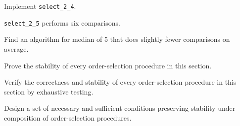 \begin{exercise}
	Implement \verb|select_2_4|.
\end{exercise}

\begin{lemma}
	\verb|select_2_5| performs six comparisons.
\end{lemma}

\begin{exercise}
	Find an algorithm for median of 5 that does slightly fewer comparisons
	on average.
\end{exercise}

\begin{exercise}
	Prove the stability of every order-selection procedure in this
	section.
\end{exercise}

\begin{exercise}
	Verify the correctness and stability of every order-selection
	procedure in this section by exhaustive testing.
\end{exercise}

\begin{project}
	Design a set of necessary and sufficient conditions preserving
	stability under composition of order-selection procedures.
\end{project}
